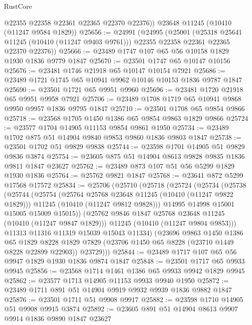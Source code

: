 \begin{lexlean}{RustCore}
\begin{coremodule}
        @22355
        @22358
        @22361
        @22365
        @22370
        @22376))
    @23648
    @11245
    (@10410 (@11247 @9584 @1829))
@25656 := @24991
    (@24995
      (@25001
        (@25318 @25641 @11245 (@10410 (@11247 @9403 @9761)))
        @22355
        @22358
        @22361
        @22365
        @22370
        @22376))
@25666 := @23489 @1747 @107 @65 @56 @10158 @1829 @1930 @1836 @9779 @1847
@25670 := @23501 @1747 @65 @10147 @10156
@25676 := @23481 @1746 @21918 @65 @10147 @10154 @7921
@25686 := @23489 @1721 @1745 @65 @10941 @9962 @10146 @10153 @1836 @9787 @1847
@25690 := @23501 @1721 @65 @9951 @9960
@25696 := @23481 @1720 @21918 @65 @9951 @9958 @7921
@25706 := @23489 @1708 @1719 @65 @10941 @9868 @9950 @9957 @1836 @9795 @1847
@25710 := @23501 @1708 @65 @9854 @9866
@25718 := @23568 @1705 @1450 @1386 @65 @9854 @9863 @1829 @9866
@25724 := @23577 @1704 @14905 @11153 @9854 @9861 @1950
@25734 := @23489 @1702 @875 @51 @14904 @9840 @9853 @9860 @1836 @9803 @1847
@25738 := @23501 @1702 @51 @9829 @9838
@25744 := @23598 @1701 @14905 @51 @9829 @9836 @3874
@25754 := @23605 @875 @51 @14904 @8613 @9828 @9835 @1836 @9811 @1847 @23627
@25762 := @23489 @873 @107 @51 @56 @5299 @1829 @1930 @1836
@25764 := @25762 @9821 @1847
@25768 := @23641 @872 @5299 @17568 @17572
@25834 := @25706
    (@25710
      (@25718
        (@25724
          (@25734
            (@25738
              (@25744
                (@25754
                  (@25764 @25768 @23648 @11245 (@10410 (@11247 @9822 @1829)))
                  @11245
                  (@10410 (@11247 @9812 @9828)))
                @14995
                @14998
                @15001
                @15005
                @15009
                @15015))
            (@25762 @9846 @1847 @25768 @23648 @11245 (@10410 (@11247 @9847 @1829)))
            @11245
            (@10410 (@11247 @9804 @9853)))
          @11313
          @11316
          @11319
          @15039
          @15043
          @11334)
        (@23696
          @9863
          @1450
          @1386
          @65
          @1829
          @8228
          @1829
          @7829
          (@23706 @1450 @65 @8228 (@23710 @1449 @8228 @22899 @22903))
          @23729)))
@25844 := @23489 @1717 @107 @65 @56 @9947 @1829 @1930 @1836 @9874 @1847
@25848 := @23501 @1717 @65 @9933 @9945
@25856 := @23568 @1714 @1461 @1386 @65 @9933 @9942 @1829 @9945
@25862 := @23577 @1713 @14905 @11153 @9933 @9940 @1950
@25872 := @23489 @1711 @891 @51 @14904 @9919 @9932 @9939 @1836 @9882 @1847
@25876 := @23501 @1711 @51 @9908 @9917
@25882 := @23598 @1710 @14905 @51 @9908 @9915 @3874
@25892 := @23605 @891 @51 @14904 @8613 @9907 @9914 @1836 @9890 @1847 @23627

\end{coremodule}
\end{lexlean}
